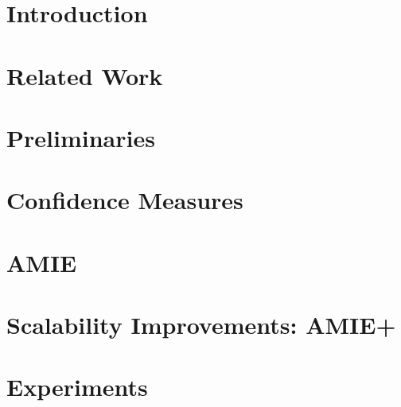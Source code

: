 \section{Introduction}
\label{sec:introduction}



\section{Related Work}
\label{sec:relatedWork}



\section{Preliminaries}
\label{sec:preliminaries}



% 

\section{Confidence Measures}
\label{sec:pca}



\section{AMIE}
\label{sec:alg}



\section{Scalability Improvements: AMIE+}
\label{sec:improvements}



\section{Experiments}
\label{sec:experiments}



